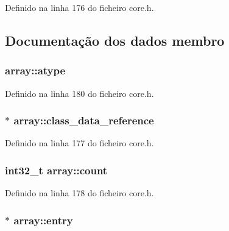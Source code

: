 Definido na linha 176 do ficheiro core.\-h.



\subsection{Documentação dos dados membro}
\hypertarget{structarray_af7ebd5860861c4c445eea16d8385bee6}{
\subsubsection[{atype}]{ array\-::atype}}\label{structarray_af7ebd5860861c4c445eea16d8385bee6}


Definido na linha 180 do ficheiro core.\-h.

\hypertarget{structarray_a48536838f6c8518606bb3ab53b8992c5}{
\subsubsection[{class\-\_\-data\-\_\-reference}]{$\ast$ array\-::class\-\_\-data\-\_\-reference}}\label{structarray_a48536838f6c8518606bb3ab53b8992c5}


Definido na linha 177 do ficheiro core.\-h.

\hypertarget{structarray_ac87b36a4ba31b9d2a2bf77af4c136428}{
\subsubsection[{count}]{\setlength{\rightskip}{0pt plus 5cm}int32\-\_\-t array\-::count}}\label{structarray_ac87b36a4ba31b9d2a2bf77af4c136428}


Definido na linha 178 do ficheiro core.\-h.

\hypertarget{structarray_ae5d7e6555edc115b43c4595ab022023d}{
\subsubsection[{entry}]{$\ast$ array\-::entry}}\label{structarray_ae5d7e6555edc115b43c4595ab022023d}


